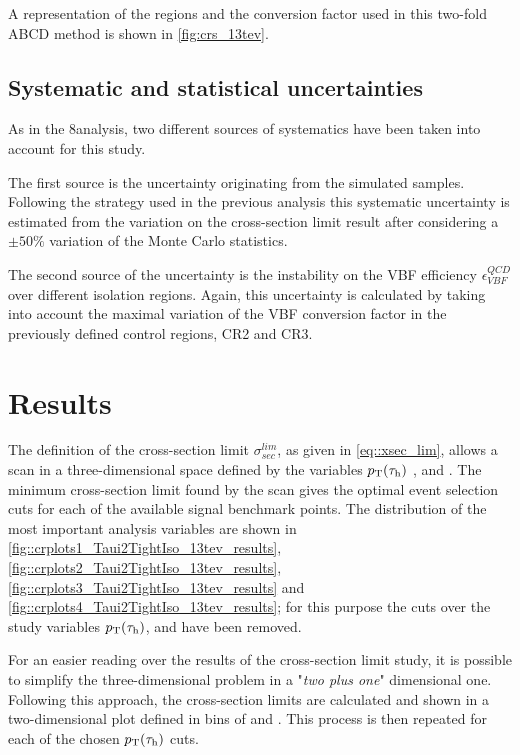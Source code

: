 A representation of the regions and the conversion factor used in this two-fold ABCD method is shown in \autoref{fig:crs_13tev}.

\subsection{Systematic and statistical uncertainties}

As in the 8\tev analysis, two different sources of systematics have been taken into account for this study. 

The first source is the uncertainty originating from the simulated samples. Following the strategy used in the previous analysis this systematic uncertainty is estimated from the variation on the cross-section limit result after considering a $\pm 50\%$ variation of the Monte Carlo statistics.

The second source of the uncertainty is the instability on the VBF efficiency $\epsilon^{QCD}_{VBF}$ over different \hadtau isolation regions. Again, this uncertainty is calculated by taking into account the maximal variation of the VBF conversion factor in the previously defined control regions, CR2 and CR3.

\section{Results}

The definition of the cross-section limit $\sigma^{lim}_{sec}$, as given in \autoref{eq::xsec_lim}, allows a scan in a three-dimensional space defined by the variables $p_{\text{T}}(\tau_{\text{h}})$ , \mjj and \met. The minimum cross-section limit found by the scan gives the optimal event selection cuts for each of the available signal benchmark points. The distribution of the most important analysis variables are shown in \autoref{fig::crplots1_Taui2TightIso_13tev_results}, \autoref{fig::crplots2_Taui2TightIso_13tev_results}, \autoref{fig::crplots3_Taui2TightIso_13tev_results} and \autoref{fig::crplots4_Taui2TightIso_13tev_results}; for this purpose the cuts over the study variables $p_{\text{T}}(\tau_{\text{h}})$, \mjj and \met have been removed. 

For an easier reading over the results of the cross-section limit study, it is possible to simplify the three-dimensional problem in a "\textit{two plus one}" dimensional one. Following this approach, the cross-section limits are calculated and shown in a two-dimensional plot defined in bins of \mjj and \met. This process is then repeated for each of the chosen $p_{\text{T}}(\tau_{\text{h}})$ cuts.

